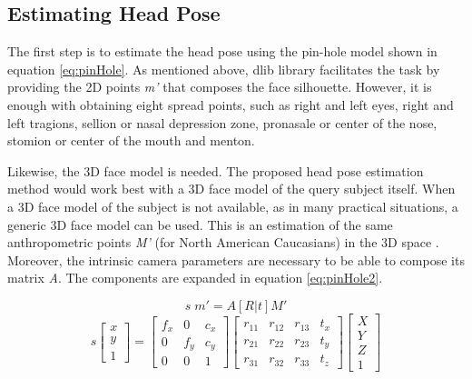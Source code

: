 \documentclass{sig-alternate}
\begin{document}
\subsection{Estimating Head Pose}
The first step is to estimate the head pose using the pin-hole model shown in
equation \ref{eq:pinHole}. As mentioned above, dlib library facilitates the task
by providing the 2D points \textit{m'} that composes the face silhouette.
However, it is enough with obtaining eight spread points, such as right and left
eyes, right and left tragions, sellion or nasal depression zone, pronasale or
center of the nose, stomion or center of the mouth and menton.

Likewise, the 3D face model is needed. The proposed head pose estimation method
would work best with a 3D face model of the query subject itself. When a 3D face
model of the subject is not available, as in many practical situations, a
generic 3D face model can be used. This is an estimation of the same
anthropometric points \textit{M'} (for North American Caucasians) in the 3D
space \cite{farkas1994anthropometry}. Moreover, the intrinsic camera parameters
are necessary to be able to compose its matrix \textit{A}. The components are
expanded in equation \ref{eq:pinHole2}.	

\begin{equation}
s  \; m' = A [R|t] M'
\label{eq:pinHole}
\end{equation}
\begin{equation}
s
\begin{bmatrix}
x \\
y \\
1
\end{bmatrix}
=
\begin{bmatrix}
f_x & 0 & c_x  \\
0 & f_y & c_y  \\
0 & 0 & 1 
\end{bmatrix}
\begin{bmatrix}
r_{11} & r_{12} & r_{13} & t_x  \\
r_{21} & r_{22} & r_{23} & t_y  \\
r_{31} & r_{32} & r_{33} & t_z  
\end{bmatrix}
\begin{bmatrix}
X \\
Y \\
Z \\
1
\end{bmatrix}
\label{eq:pinHole2}
\end{equation}
\end{document}
